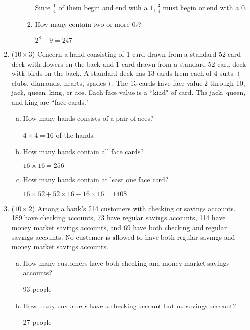 \documentclass[12pt]{article}
\begin{document}
\begin{enumerate}
\begin{enumerate}[a.]
\begin{enumerate}
				Since $\frac{1}{4}$ of them begin and end with a $1$, $\frac{3}{4}$ must begin or end with a $0$.

				\item How many contain two or more 0s?

				$2^8 - 9 = 247$
			\end{enumerate}
		\end{enumerate}

		\newpage

		\item ($10 \times 3$)
		Concern a hand consisting of 1 card drawn from a standard 52-card deck with flowers on the back and 1 card drawn from a standard 52-card deck with birds on the back. A standard deck has 13 cards from each of 4 suits $\left( \right.$clubs, diamonds, hearts, spades$\left. \right)$. The 13 cards have face value 2 through 10, jack, queen, king, or ace. Each face value is a ``kind" of card. The jack, queen, and king are ``face cards."
		\begin{enumerate}[a.]
			\item How many hands consists of a pair of aces?

			$4 \times 4 = 16$ of the hands.

			\item How many hands contain all face cards?

			$16 \times 16 = 256$

			\item How many hands contain at least one face card?

			$16 \times 52 + 52 \times 16 - 16 \times 16 = 1408$
		\end{enumerate}

			\newpage

		\item ($10 \times 2$)
		Among a bank's 214 customers with checking or savings accounts, 189 have checking accounts, 73 have regular savings accounts, 114 have money market savings accounts, and 69 have both checking and regular savings accounts. No customer is allowed to have both regular savings and money market savings accounts.
		\begin{enumerate}[a.]
			\item
			How many customers have both checking and money market savings accounts?

			93 people
			\item
			How many customers have a checking account but no savings account?

			27 people
		\end{enumerate}



\end{enumerate}
\end{document}
